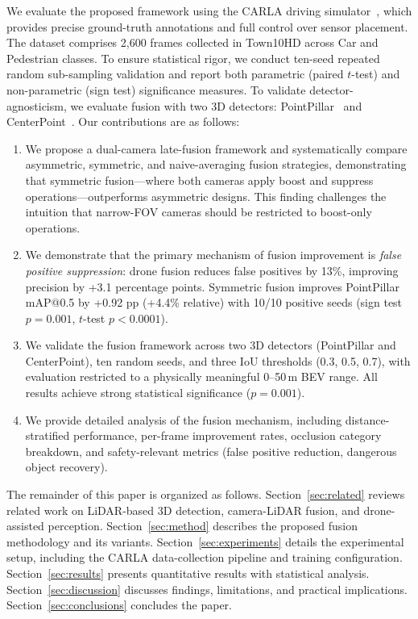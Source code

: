 \documentclass[sustainability,article,submit,moreauthors,pdftex]{Definitions/mdpi}
\begin{document}
We evaluate the proposed framework using the CARLA driving simulator~\cite{dosovitskiy2017carla}, which provides precise ground-truth annotations and full control over sensor placement. The dataset comprises 2{,}600 frames collected in Town10HD across Car and Pedestrian classes. To ensure statistical rigor, we conduct ten-seed repeated random sub-sampling validation and report both parametric (paired $t$-test) and non-parametric (sign test) significance measures. To validate detector-agnosticism, we evaluate fusion with two 3D detectors: PointPillar~\cite{lang2019pointpillars} and CenterPoint~\cite{yin2021centerpoint}. Our contributions are as follows:

\begin{enumerate}[leftmargin=*,labelsep=4.9mm]
\item We propose a dual-camera late-fusion framework and systematically compare asymmetric, symmetric, and naive-averaging fusion strategies, demonstrating that symmetric fusion---where both cameras apply boost and suppress operations---outperforms asymmetric designs. This finding challenges the intuition that narrow-FOV cameras should be restricted to boost-only operations.

\item We demonstrate that the primary mechanism of fusion improvement is \emph{false positive suppression}: drone fusion reduces false positives by 13\%, improving precision by +3.1 percentage points. Symmetric fusion improves PointPillar mAP@0.5 by +0.92 pp (+4.4\% relative) with 10/10 positive seeds (sign test $p = 0.001$, $t$-test $p < 0.0001$).

\item We validate the fusion framework across two 3D detectors (PointPillar and CenterPoint), ten random seeds, and three IoU thresholds (0.3, 0.5, 0.7), with evaluation restricted to a physically meaningful 0--50\,m BEV range. All results achieve strong statistical significance ($p = 0.001$).

\item We provide detailed analysis of the fusion mechanism, including distance-stratified performance, per-frame improvement rates, occlusion category breakdown, and safety-relevant metrics (false positive reduction, dangerous object recovery).
\end{enumerate}

The remainder of this paper is organized as follows. Section~\ref{sec:related} reviews related work on LiDAR-based 3D detection, camera-LiDAR fusion, and drone-assisted perception. Section~\ref{sec:method} describes the proposed fusion methodology and its variants. Section~\ref{sec:experiments} details the experimental setup, including the CARLA data-collection pipeline and training configuration. Section~\ref{sec:results} presents quantitative results with statistical analysis. Section~\ref{sec:discussion} discusses findings, limitations, and practical implications. Section~\ref{sec:conclusions} concludes the paper.
\end{document}

